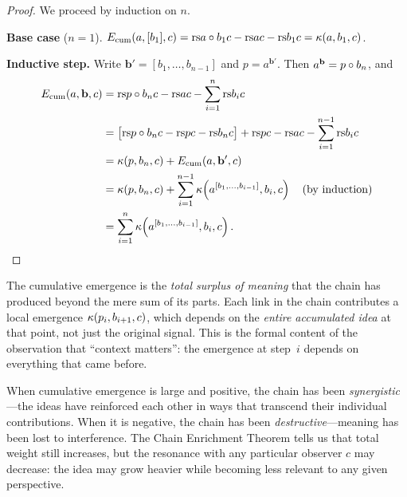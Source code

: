 \begin{proof}
We proceed by induction on $n$.

\textbf{Base case} ($n = 1$).
$E_{\mathrm{cum}}(a, [b_1], c) = \mathrm{rs}{a \circ b_1}{c} - \mathrm{rs}{a}{c} - \mathrm{rs}{b_1}{c}
= \kappa(a, b_1, c)$.

\textbf{Inductive step.}
Write $\mathbf{b}' = [b_1, \ldots, b_{n-1}]$ and $p = a^{\mathbf{b}'}$.
Then $a^{\mathbf{b}} = p \circ b_n$, and
\begin{align*}
  E_{\mathrm{cum}}(a, \mathbf{b}, c)
  &= \mathrm{rs}{p \circ b_n}{c} - \mathrm{rs}{a}{c}
     - \sum_{i=1}^{n} \mathrm{rs}{b_i}{c} \\
  &= \bigl[\mathrm{rs}{p \circ b_n}{c} - \mathrm{rs}{p}{c} - \mathrm{rs}{b_n}{c}\bigr]
     + \mathrm{rs}{p}{c} - \mathrm{rs}{a}{c}
     - \sum_{i=1}^{n-1} \mathrm{rs}{b_i}{c} \\
  &= \kappa(p, b_n, c) + E_{\mathrm{cum}}(a, \mathbf{b}', c) \\
  &= \kappa(p, b_n, c)
     + \sum_{i=1}^{n-1} \kappa\!\left(
         a^{[b_1, \ldots, b_{i-1}]}, b_i, c
       \right) \quad\text{(by induction)}\\
  &= \sum_{i=1}^{n} \kappa\!\left(
       a^{[b_1, \ldots, b_{i-1}]}, b_i, c
     \right). \qedhere
\end{align*}
\end{proof}

\begin{interpretation}
The cumulative emergence is the \emph{total surplus of meaning} that the chain
has produced beyond the mere sum of its parts.  Each link in the chain
contributes a local emergence $\kappa(p_i, b_{i+1}, c)$, which depends on the
\emph{entire accumulated idea} at that point, not just the original signal.
This is the formal content of the observation that ``context matters'': the
emergence at step~$i$ depends on everything that came before.

When cumulative emergence is large and positive, the chain has been
\emph{synergistic}---the ideas have reinforced each other in ways that
transcend their individual contributions.  When it is negative, the chain
has been \emph{destructive}---meaning has been lost to interference.  The
Chain Enrichment Theorem tells us that total weight still increases, but
the resonance with any particular observer $c$ may decrease: the idea may
grow heavier while becoming less relevant to any given perspective.
\end{interpretation}


